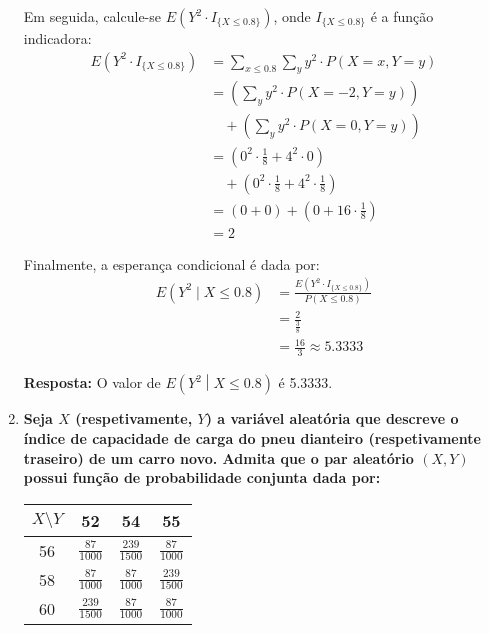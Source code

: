 \documentclass[a4paper,12pt]{article}
\begin{document}
\begin{enumerate}
\begin{mdframed}[backgroundcolor=gray!10, linewidth=0pt, innertopmargin=10pt, innerbottommargin=10pt]
  Em seguida, calcule-se \( E(Y^2 \cdot I_{\{X \leq 0.8\}}) \), onde \( I_{\{X \leq 0.8\}} \) é a função indicadora:
  \begin{align*}
    E(Y^2 \cdot I_{\{X \leq 0.8\}}) &= \sum_{x \leq 0.8} \sum_{y} 
    y^2 \cdot P(X = x, Y = y) \\
    &= \left( \sum_{y} y^2 \cdot P(X = -2, Y = y) \right) \\
    &\quad + \left( \sum_{y} y^2 \cdot P(X = 0, Y = y) \right) \\
    &= \left( 0^2 \cdot \frac{1}{8} + 4^2 \cdot 0 \right) \\
    &\quad + \left( 0^2 \cdot \frac{1}{8} + 4^2 \cdot \frac{1}{8} \right) \\
    &= \left( 0 + 0 \right) + \left( 0 + 16 \cdot \frac{1}{8} \right) \\
    &= 2
  \end{align*}

  Finalmente, a esperança condicional é dada por:
  \begin{align*}
    E(Y^2 \mid X \leq 0.8) &= \frac{E(Y^2 \cdot I_{\{X \leq 0.8\}})}{P(X \leq 0.8)} \\
    &= \frac{2}{\frac{3}{8}} \\
    &= \frac{16}{3} \approx 5.3333
  \end{align*}

  \textbf{Resposta:} O valor de \( E\left( Y^2 \middle| X \leq 0.8 \right) \) é 5.3333.
  \end{mdframed}

  \vspace{0.5cm}

  \item \textbf{Seja \( X \) (respetivamente, \( Y \)) a variável aleatória que descreve o índice de capacidade de carga do pneu dianteiro (respetivamente traseiro) de um carro novo. Admita que o par aleatório \((X, Y)\) possui função de probabilidade conjunta dada por:}

  \vspace{0.3cm}

  \begin{center}
    \small
    \renewcommand{\arraystretch}{1.8}  %
    \setlength{\tabcolsep}{12pt}       %
    \begin{tabular}{|c|c|c|c|}
      \hline
      \( X \setminus Y \) & 52 & 54 & 55 \\ \hline
      56 & $\frac{87}{1000}$ & $\frac{239}{1500}$ & $\frac{87}{1000}$ \\ \hline
      58 & $\frac{87}{1000}$ & $\frac{87}{1000}$ & $\frac{239}{1500}$ \\ \hline
      60 & $\frac{239}{1500}$ & $\frac{87}{1000}$ & $\frac{87}{1000}$ \\ \hline
    \end{tabular}
  \end{center}


\end{enumerate}
\end{document}
